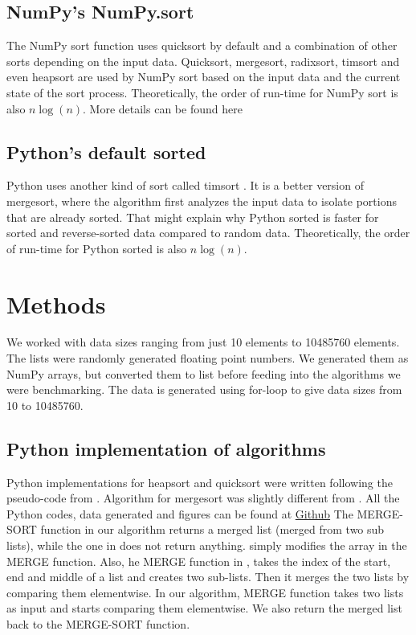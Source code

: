 \documentclass[sigconf, nonacm, natbib, screen, balance=False]{acmart}
\begin{document}
\subsection{NumPy's NumPy.sort}\label{sec:NumPy sort}
The NumPy sort function uses quicksort by default and a combination of other sorts depending on the input data. Quicksort, mergesort, radixsort, timsort and even heapsort are used by NumPy sort based on the input data and the current state of the sort process.\newline
Theoretically, the order of run-time for NumPy sort is also $n\log(n)$. More details can be found here \citet{NumPySortDocumentation} 

\subsection{Python's default sorted}\label{sec:sorted sort}
Python uses another kind of sort called timsort \citet{TimPetersArticle}. It is a better version of mergesort, where the algorithm first analyzes the input data to isolate portions that are already sorted. That might explain why Python sorted is faster for sorted and reverse-sorted data compared to random data.\newline
Theoretically, the order of run-time for Python sorted  is also $n\log(n)$.

\section{Methods}\label{sec:methods}
We worked with data sizes ranging from just 10 elements to 10485760 elements. The lists were randomly generated floating point numbers. We generated them as NumPy arrays, but converted them to list before feeding into the algorithms we were benchmarking. The data is generated using for-loop to give data sizes from 10 to 10485760. 

\subsection{Python implementation of algorithms}\label{sec:Python implementation}

Python implementations for heapsort and quicksort were written following the pseudo-code from \citet{CLRS_2009}. Algorithm for mergesort was slightly different from \citet{CLRS_2009}. All the Python codes, data generated and figures can be found at \href{https://github.com/vsnupoudel/termpaper01.}{Github} \newline
The MERGE-SORT function in our algorithm returns a merged list (merged from two sub lists), while the one in \citet{CLRS_2009} does not return anything. \citet{CLRS_2009} simply modifies the array in the MERGE function.
Also, he MERGE function in \citet{CLRS_2009}, takes the index of the start, end and middle of a list and creates two sub-lists. Then it merges the two lists by comparing them elementwise. In our algorithm, MERGE function takes two lists as input and starts comparing them elementwise. We also return the merged list back to the MERGE-SORT function.
\end{document}
